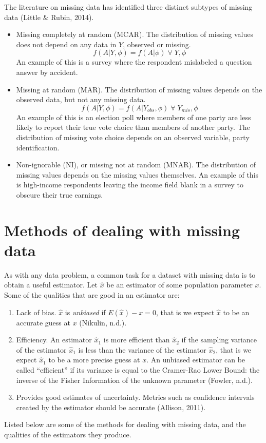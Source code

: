 \documentclass[12pt,twoside]{reedthesis}
\begin{document}
The literature on missing data has identified three distinct subtypes of missing data (Little \& Rubin, 2014).
\begin{itemize}
\item
  Missing completely at random (MCAR). The distribution of missing values does not depend on any data in \(Y\), observed or missing. \[f(A|Y,\phi) = f(A|\phi) \;\forall\; Y,\phi\] An example of this is a survey where the respondent mislabeled a question answer by accident.
\item
  Missing at random (MAR). The distribution of missing values depends on the observed data, but not any missing data. \[f(A|Y,\phi) = f(A|Y_{obs},\phi) \;\forall\; Y_{mis},\phi\] An example of this is an election poll where members of one party are less likely to report their true vote choice than members of another party. The distribution of missing vote choice depends on an observed variable, party identification.
\item
  Non-ignorable (NI), or missing not at random (MNAR). The distribution of missing values depends on the missing values themselves. An example of this is high-income respondents leaving the income field blank in a survey to obscure their true earnings.
\end{itemize}
\hypertarget{methods-of-dealing-with-missing-data}{%
\section{Methods of dealing with missing data}\label{methods-of-dealing-with-missing-data}}

As with any data problem, a common task for a dataset with missing data is to obtain a useful estimator. Let \(\hat{x}\) be an estimator of some population parameter \(x\). Some of the qualities that are good in an estimator are:
\begin{enumerate}
\def\labelenumi{\arabic{enumi}.}
\item
  Lack of bias. \(\hat{x}\) is \emph{unbiased} if \(E(\hat{x}) - x = 0\), that is we expect \(\hat{x}\) to be an accurate guess at \(x\) (Nikulin, n.d.).
\item
  Efficiency. An estimator \(\hat{x}_1\) is more efficient than \(\hat{x}_2\) if the sampling variance of the estimator \(\hat{x}_1\) is less than the variance of the estimator \(\hat{x}_2\), that is we expect \(\hat{x}_1\) to be a more precise guess at \(x\). An unbiased estimator can be called ``efficient'' if its variance is equal to the Cramer-Rao Lower Bound: the inverse of the Fisher Information of the unknown parameter (Fowler, n.d.).
\item
  Provides good estimates of uncertainty. Metrics such as confidence intervals created by the estimator should be accurate (Allison, 2011).
\end{enumerate}
Listed below are some of the methods for dealing with missing data, and the qualities of the estimators they produce.
\end{document}
